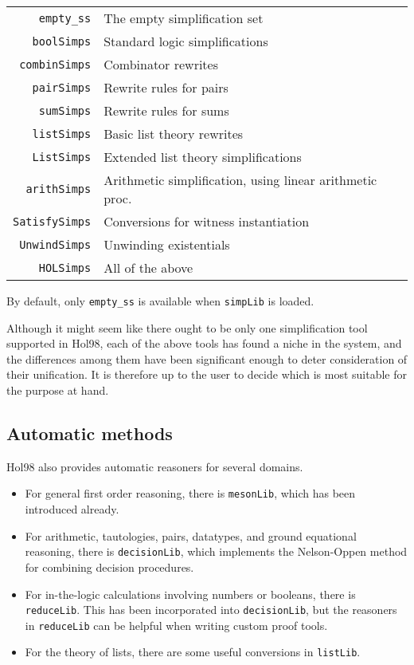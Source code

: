 \documentclass[12pt,fleqn,layout,a4paper]{report}
\begin{document}
\begin{description}
\begin{center}
\begin{tabular}{|r|l|} \hline
\verb+empty_ss+ & The empty simplification set \\
\verb+boolSimps+ & Standard logic simplifications \\
\verb+combinSimps+ & Combinator rewrites \\
\verb+pairSimps+ & Rewrite rules for pairs \\
\verb+sumSimps+ & Rewrite rules for sums \\
\verb+listSimps+ & Basic list theory rewrites \\
\verb+ListSimps+ & Extended list theory simplifications \\
\verb+arithSimps+ & Arithmetic simplification, using linear arithmetic proc. \\
\verb+SatisfySimps+ & Conversions for witness instantiation \\
\verb+UnwindSimps+ & Unwinding existentials \\
\verb+HOLSimps+ &  All of the above \\
 \hline
\end{tabular}
\end{center}

By default, only \verb+empty_ss+ is available when \verb+simpLib+ is loaded.
\end{description}

Although it might seem like there ought to be only one simplification
tool supported in Hol98, each of the above tools has found a niche in
the system, and the differences among them have been significant enough
to deter consideration of their unification. It is therefore up to the
user to decide which is most suitable for the purpose at hand.


\subsection{Automatic methods}

Hol98 also provides automatic reasoners for several domains.

\begin{itemize}

\item For general first order reasoning, there is \verb+mesonLib+, which
      has been introduced already.

\item For arithmetic, tautologies, pairs, datatypes, and ground
      equational reasoning, there is \verb+decisionLib+, which
      implements the Nelson-Oppen method for combining decision procedures.

\item For in-the-logic calculations involving numbers or booleans, there
      is \verb+reduceLib+. This has been incorporated into
      \verb+decisionLib+, but the reasoners in \verb+reduceLib+ can be
      helpful when writing custom proof tools.

\item For the theory of lists, there are some useful conversions in
      \verb+listLib+.
\end{itemize}
\end{document}
